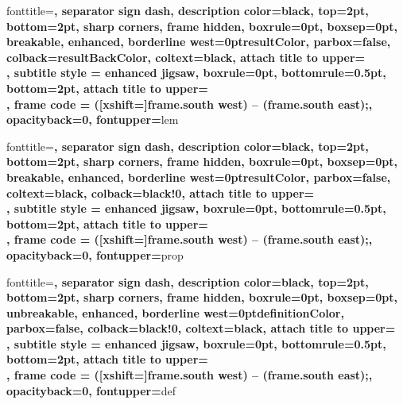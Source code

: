     {\begin{tcbcorollary}{#1}{#2}}{\end{tcbcorollary}}
     {fonttitle=\sffamily\bfseries\color{resultColor},
      separator sign dash, description color=black,
      top=2pt, bottom=2pt,
      sharp corners,
      frame hidden, boxrule=0pt, boxsep=0pt, breakable,
      enhanced, borderline west={\the\tcbBorderWidth}{0pt}{resultColor},
      parbox=false,
      colback=resultBackColor,
      coltext=black,
      attach title to upper={\\},
      subtitle style = {enhanced jigsaw, boxrule=0pt, bottomrule=0.5pt, bottom=2pt,
      attach title to upper={\\},
      frame code = { ([xshift=\the\tcbBorderWidth]frame.south west) -- (frame.south east);}, 
      opacityback=0, fontupper=\color{black}}}{lem}
    {\begin{tcblemma}{#1}{#2}}{\end{tcblemma}}
%
     {fonttitle=\sffamily\bfseries\color{resultColor},
      separator sign dash, description color=black,
      top=2pt, bottom=2pt,
      sharp corners,
      frame hidden, boxrule=0pt, boxsep=0pt, breakable,
      enhanced, borderline west={\the\tcbBorderWidth}{0pt}{resultColor},
      parbox=false,
      coltext=black,
      colback=black!0,
      attach title to upper={\\},
      subtitle style = {enhanced jigsaw, boxrule=0pt, bottomrule=0.5pt, bottom=2pt,
      attach title to upper={\\},
      frame code = { ([xshift=\the\tcbBorderWidth]frame.south west) -- (frame.south east);}, 
      opacityback=0, fontupper=\color{black}}}{prop}
    {\begin{tcbproposition}{#1}{#2}}{\end{tcbproposition}}
%
     {fonttitle=\sffamily\bfseries\color{definitionColor},
      separator sign dash, description color=black,
      top=2pt, bottom=2pt,
      sharp corners,
      frame hidden, boxrule=0pt, boxsep=0pt, unbreakable,
      enhanced, borderline west={\the\tcbBorderWidth}{0pt}{definitionColor},
      parbox=false,
      colback=black!0,
      coltext=black,
      attach title to upper={\\},
      subtitle style = {enhanced jigsaw, boxrule=0pt, bottomrule=0.5pt, bottom=2pt,
      attach title to upper={\\},
      frame code = { ([xshift=\the\tcbBorderWidth]frame.south west) -- (frame.south east);}, 
      opacityback=0, fontupper=\color{black}}}{def}
